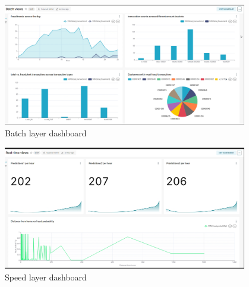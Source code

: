 \documentclass[12pt,a4paper, hidelinks]{article}
\begin{document}
\begin{figure}[H]
    \centering
    \includegraphics[width=0.95\textwidth]{images/superset-1.png}
    \caption{Batch layer dashboard}
    \label{fig:batch-dashboard}
\end{figure}


\begin{figure}[H]
    \centering
    \includegraphics[width=0.95\textwidth]{images/superset-2.png}
    \caption{Speed layer dashboard}
    \label{fig:speed-dashboard}
\end{figure}
\end{document}
